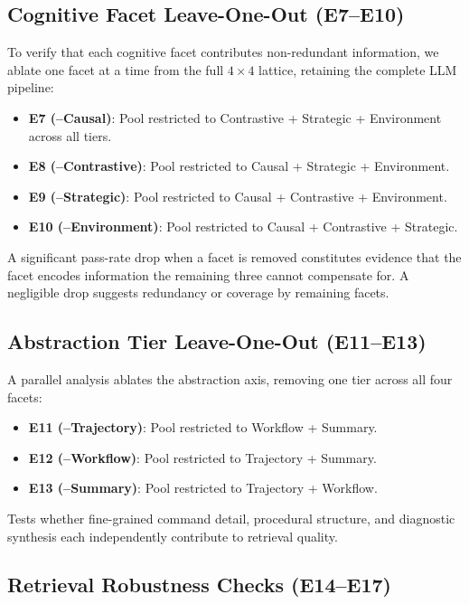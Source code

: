 \documentclass[letterpaper]{article} %
\begin{document}
\subsection{Cognitive Facet Leave-One-Out (E7--E10)}

To verify that each cognitive facet contributes non-redundant information, we ablate one facet at a time from the full $4 \times 4$ lattice, retaining the complete LLM pipeline:

\begin{itemize}
    \item \textbf{E7 (--Causal)}: Pool restricted to Contrastive + Strategic + Environment across all tiers.
    \item \textbf{E8 (--Contrastive)}: Pool restricted to Causal + Strategic + Environment.
    \item \textbf{E9 (--Strategic)}: Pool restricted to Causal + Contrastive + Environment.
    \item \textbf{E10 (--Environment)}: Pool restricted to Causal + Contrastive + Strategic.
\end{itemize}

A significant pass-rate drop when a facet is removed constitutes evidence that the facet encodes information the remaining three cannot compensate for. A negligible drop suggests redundancy or coverage by remaining facets.

\subsection{Abstraction Tier Leave-One-Out (E11--E13)}

A parallel analysis ablates the abstraction axis, removing one tier across all four facets:

\begin{itemize}
    \item \textbf{E11 (--Trajectory)}: Pool restricted to Workflow + Summary.
    \item \textbf{E12 (--Workflow)}: Pool restricted to Trajectory + Summary.
    \item \textbf{E13 (--Summary)}: Pool restricted to Trajectory + Workflow.
\end{itemize}

Tests whether fine-grained command detail, procedural structure, and diagnostic synthesis each independently contribute to retrieval quality.

\subsection{Retrieval Robustness Checks (E14--E17)}
\end{document}
